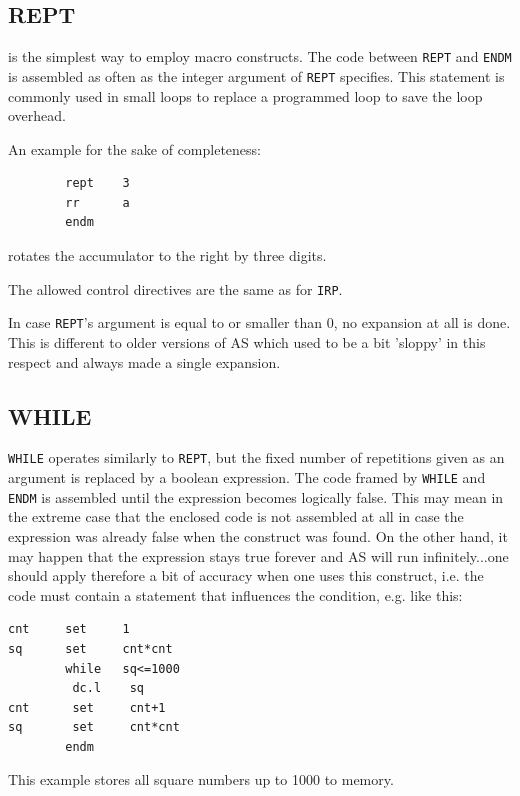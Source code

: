 \documentclass[12pt,twoside]{report}
\makeatletter
\newcommand{\tty}[1]{{\tt #1}}
\newcommand{\ttindex}[1]{\index{#1@{\tt #1}}}
\newcommand{\asname}{{AS}}
\makeatother
\begin{document}

\subsection{REPT}
\ttindex{REPT}

is the simplest way to employ macro constructs.  The code between
\tty{REPT} and \tty{ENDM} is assembled as often as the integer argument of
\tty{REPT} specifies.  This statement is commonly used in small loops to
replace a programmed loop to save the loop overhead.

An example for the sake of completeness:
\begin{verbatim}
        rept    3
        rr      a
        endm
\end{verbatim}
rotates the accumulator to the right by three digits.

The allowed control directives are the same as for \tty{IRP}.

In case \tty{REPT}'s argument is equal to or smaller than 0, no expansion
at all is done.  This is different to older versions of \asname{} which used to
be a bit 'sloppy' in this respect and always made a single expansion.


\subsection{WHILE}
\ttindex{WHILE}

\tty{WHILE} operates similarly to \tty{REPT}, but the fixed number of
repetitions given as an argument is replaced by a boolean expression.  The
code framed by \tty{WHILE} and \tty{ENDM} is assembled until the
expression becomes logically false.  This may mean in the extreme case
that the enclosed code is not assembled at all in case the expression was
already false when the construct was found.  On the other hand, it may
happen that the expression stays true forever and \asname{} will run
infinitely...one should apply therefore a bit of accuracy when one uses
this construct, i.e. the code must contain a statement that influences the
condition, e.g. like this:
\begin{verbatim}
cnt     set     1
sq      set     cnt*cnt
        while   sq<=1000
         dc.l    sq
cnt      set     cnt+1
sq       set     cnt*cnt
        endm
\end{verbatim}
This example stores all square numbers up to 1000 to memory.
\end{document}
